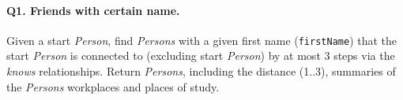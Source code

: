 \paragraph{\textbf{Q1}. Friends with certain name.}
Given a start \emph{Person}, find \emph{Persons} with a given first name
(\texttt{firstName}) that the start \emph{Person} is connected to
(excluding start \emph{Person}) by at most 3 steps via the \emph{knows}
relationships. Return \emph{Persons}, including the distance (1..3),
summaries of the \emph{Persons} workplaces and places of study.
